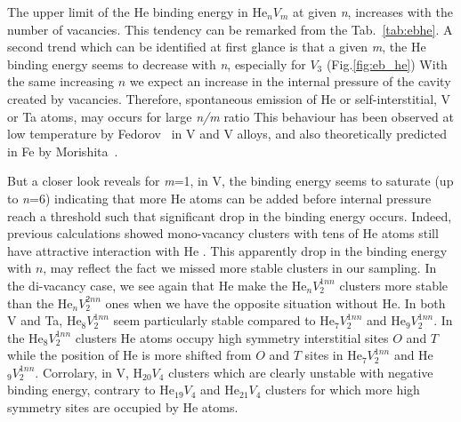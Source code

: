 \documentclass[a4,12pt,showpacs,preprintnumbers,amsmath,amssymb]{revtex4}
\begin{document}
The upper limit of the He binding energy in He$_nV_m$ at given \textit{n}, 
increases with the number of vacancies. This tendency can be remarked from the Tab.~\ref{tab:ebhe}.
% 
A second trend which can be identified at first glance is that a given \textit{m}, 
the He binding energy seems to decrease with \textit{n}, especially for $V_3$ (Fig.\ref{fig:eb_he})
With the same increasing $n$ we expect an increase in the  internal pressure of the cavity created by vacancies.  
Therefore, spontaneous emission of He or self-interstitial, V or Ta atoms, may occurs for large \textit{n/m} ratio \cite{SUBRAHMANYAM1996,SUBRAHMANYAM1995}
This behaviour has been observed at low temperature by Fedorov~\cite{Fedorov1996} in V and V alloys, 
and also theoretically predicted in Fe by Morishita~\cite{Morishita2003}.
 
But a closer look reveals for \textit{m}=1, in V, 
the binding energy seems to saturate (up to \textit{n}=6) indicating that more He atoms can be added 
before internal pressure reach a threshold such that significant drop in the binding energy occurs. 
Indeed, previous calculations showed mono-vacancy clusters with tens of He atoms still have attractive interaction 
with He \cite{Li2013}.
This apparently drop in the binding energy with $n$, may reflect the fact we missed more stable clusters in our sampling.
In the di-vacancy case, we see again that He make the He$_nV_2^{1nn}$ clusters more stable than the 
He$_nV_{2}^{2nn}$ ones when we have the opposite situation without He.
%
In both V and Ta, He$_8V_{2}^{1nn}$ seem particularly stable compared to He$_7V_{2}^{1nn}$ and He$_9V_{2}^{1nn}$. 
In the He$_8V_{2}^{1nn}$ clusters He atoms occupy high symmetry interstitial sites $O$ and $T$ 
while the position of He is more shifted from $O$ and $T$ sites in He$_7V_{2}^{1nn}$ and He$_9V_{2}^{1nn}$.
Corrolary, in V, H$_{20}V_4$ clusters which are clearly unstable with negative binding energy, 
contrary to  He$_{19}V_4$ and  He$_{21}V_4$ clusters for which more high symmetry sites are occupied by He atoms.
\end{document}
